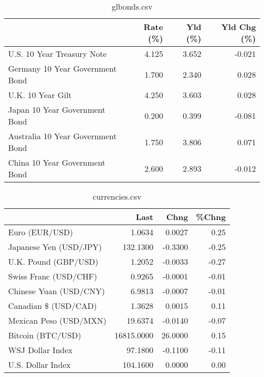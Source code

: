 \documentclass{article}%
\begin{document}
%


\begin{table}[htbp]%
\caption{glbonds.csv}%
\centering%
\begin{adjustbox}{width=1\textwidth}%
\begin{tabular}{lrrr}
\toprule
                                  &  Rate (\%) &  Yld (\%) &  Yld Chg (\%) \\
\midrule
       U.S. 10 Year Treasury Note &     4.125 &    3.652 &       -0.021 \\
  Germany 10 Year Government Bond &     1.700 &    2.340 &        0.028 \\
                U.K. 10 Year Gilt &     4.250 &    3.603 &        0.028 \\
    Japan 10 Year Government Bond &     0.200 &    0.399 &       -0.081 \\
Australia 10 Year Government Bond &     1.750 &    3.806 &        0.071 \\
    China 10 Year Government Bond &     2.600 &    2.893 &       -0.012 \\
\bottomrule
\end{tabular}
%
\end{adjustbox}%
\end{table}

%


\begin{table}[htbp]%
\caption{currencies.csv}%
\centering%
\begin{adjustbox}{width=1\textwidth}%
\begin{tabular}{lrrr}
\toprule
                       &       Last &    Chng &  \%Chng \\
\midrule
        Euro (EUR/USD) &     1.0634 &  0.0027 &   0.25 \\
Japanese Yen (USD/JPY) &   132.1300 & -0.3300 &  -0.25 \\
  U.K. Pound (GBP/USD) &     1.2052 & -0.0033 &  -0.27 \\
 Swiss Franc (USD/CHF) &     0.9265 & -0.0001 &  -0.01 \\
Chinese Yuan (USD/CNY) &     6.9813 & -0.0007 &  -0.01 \\
  Canadian \$ (USD/CAD) &     1.3628 &  0.0015 &   0.11 \\
Mexican Peso (USD/MXN) &    19.6374 & -0.0140 &  -0.07 \\
     Bitcoin (BTC/USD) & 16815.0000 & 26.0000 &   0.15 \\
      WSJ Dollar Index &    97.1800 & -0.1100 &  -0.11 \\
     U.S. Dollar Index &   104.1600 &  0.0000 &   0.00 \\
\bottomrule
\end{tabular}
%
\end{adjustbox}%
\end{table}

%
\end{document}
